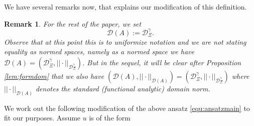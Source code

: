 \documentclass[11pt, oneside]{article}   	%
\newtheorem{remark}[theorem]{Remark}
\begin{document}
We have several remarks now, that explains our modification of this definition.

\begin{remark}\upshape  \label{rem:domainNotationset2d}
	For the rest of the paper, we set \[ \mathscr{D}(A) := \mathscr{D}_{\Xi}^{\gamma}.\] Observe that at this point this is to uniformize notation and we are not stating equality as normed spaces, namely as a normed space we have  $ \mathscr{D}(A) = (\mathscr{D}_{\Xi}^{\gamma}, ||\cdot||_{\mathscr{D}_{\Xi}^{\gamma}})$.  But in the sequel, it will be clear after Proposition \ref{lem:formdom} that we also have $ (\mathscr{D}(A), ||\cdot||_{\mathscr{D}(A)}) = (\mathscr{D}_{\Xi}^{\gamma}, ||\cdot||_{\mathscr{D}_{\Xi}^{\gamma}})$ where $||\cdot||_{\mathscr{D}(A)}$ denotes the standard (functional analytic) domain norm.
\end{remark}

We work out the following  modification of the above ansatz \eqref{equ:ansatzmain} to fit our purposes. Assume $u$ is of the form
\end{document}
